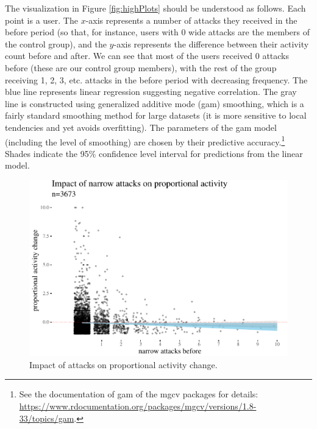 \documentclass[10pt,dvipsnames]{scrartcl}
\begin{document}
The visualization in Figure \ref{fig:highPlots} should be understood as
follows. Each point is a user. The \(x\)-axis represents a number of
attacks they received in the \textsf{before} period (so that, for
instance, users with 0 wide attacks are the members of the control
group), and the \(y\)-axis represents the difference between their
activity count \textsf{before} and \textsf{after}. We can see that most
of the users received 0 attacks before (these are our control group
members), with the rest of the group receiving 1, 2, 3, etc. attacks in
the \textsf{before} period with decreasing frequency. The blue line
represents linear regression suggesting negative correlation. The gray
line is constructed using generalized additive mode (gam) smoothing,
which is a fairly standard smoothing method for large datasets (it is
more sensitive to local tendencies and yet avoids overfitting). The
parameters of the gam model (including the level of smoothing) are
chosen by their predictive
accuracy.\footnote{See  the documentation of \textsf{gam} of the \textsf{mgcv} packages for details: \url{https://www.rdocumentation.org/packages/mgcv/versions/1.8-33/topics/gam}.}
Shades indicate the 95\% confidence level interval for predictions from
the linear model.

\begin{figure}[H]

\begin{center}\includegraphics[width=1\linewidth]{quittingShortAbridgedRevisions2_files/figure-latex/unnamed-chunk-7-1} \end{center}
\caption{Impact of attacks  on proportional activity change.}
\label{fig:propActivity}
\end{figure}
\end{document}
